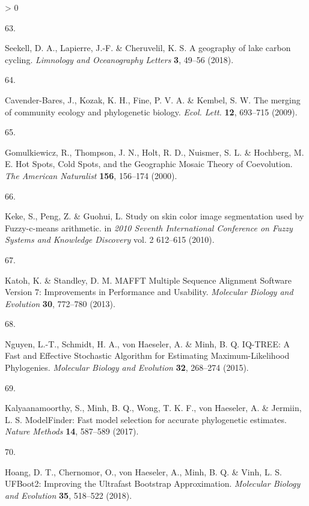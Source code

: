 \documentclass[10pt,oneside]{article}
\newlength{\cslhangindent}
\newlength{\csllabelwidth}
\newenvironment{CSLReferences}[3] %
 {%
  \setlength{\parindent}{0pt}
  \ifodd #1 \everypar{\setlength{\hangindent}{\cslhangindent}}\ignorespaces\fi
  \ifnum #2 > 0
  \setlength{\parskip}{#2\baselineskip}
  \fi
 }%
 {}
\newcommand{\CSLLeftMargin}[1]{\parbox[t]{\maxof{\widthof{#1}}{\csllabelwidth}}{#1}}
\newcommand{\CSLRightInline}[1]{\parbox[t]{\linewidth}{#1}}
\begin{document}
\begin{CSLReferences}{0}{0}
\leavevmode\hypertarget{ref-Seekell2018GeoLak}{}%
\CSLLeftMargin{63. }
\CSLRightInline{Seekell, D. A., Lapierre, J.-F. \& Cheruvelil, K. S. A
geography of lake carbon cycling. \emph{Limnology and Oceanography
Letters} \textbf{3}, 49--56 (2018).}

\leavevmode\hypertarget{ref-Cavender-Bares2009MerCom}{}%
\CSLLeftMargin{64. }
\CSLRightInline{Cavender-Bares, J., Kozak, K. H., Fine, P. V. A. \&
Kembel, S. W. The merging of community ecology and phylogenetic biology.
\emph{Ecol. Lett.} \textbf{12}, 693--715 (2009).}

\leavevmode\hypertarget{ref-Gomulkiewicz2000HotSpo}{}%
\CSLLeftMargin{65. }
\CSLRightInline{Gomulkiewicz, R., Thompson, J. N., Holt, R. D., Nuismer,
S. L. \& Hochberg, M. E. Hot Spots, Cold Spots, and the Geographic
Mosaic Theory of Coevolution. \emph{The American Naturalist}
\textbf{156}, 156--174 (2000).}

\leavevmode\hypertarget{ref-Keke2010StuSki}{}%
\CSLLeftMargin{66. }
\CSLRightInline{Keke, S., Peng, Z. \& Guohui, L. Study on skin color
image segmentation used by Fuzzy-c-means arithmetic. in \emph{2010
Seventh International Conference on Fuzzy Systems and Knowledge
Discovery} vol. 2 612--615 (2010).}

\leavevmode\hypertarget{ref-Katoh2013MafMul}{}%
\CSLLeftMargin{67. }
\CSLRightInline{Katoh, K. \& Standley, D. M. MAFFT Multiple Sequence
Alignment Software Version 7: Improvements in Performance and Usability.
\emph{Molecular Biology and Evolution} \textbf{30}, 772--780 (2013).}

\leavevmode\hypertarget{ref-Nguyen2015IqtFas}{}%
\CSLLeftMargin{68. }
\CSLRightInline{Nguyen, L.-T., Schmidt, H. A., von Haeseler, A. \& Minh,
B. Q. IQ-TREE: A Fast and Effective Stochastic Algorithm for Estimating
Maximum-Likelihood Phylogenies. \emph{Molecular Biology and Evolution}
\textbf{32}, 268--274 (2015).}

\leavevmode\hypertarget{ref-Kalyaanamoorthy2017ModFas}{}%
\CSLLeftMargin{69. }
\CSLRightInline{Kalyaanamoorthy, S., Minh, B. Q., Wong, T. K. F., von
Haeseler, A. \& Jermiin, L. S. ModelFinder: Fast model selection for
accurate phylogenetic estimates. \emph{Nature Methods} \textbf{14},
587--589 (2017).}

\leavevmode\hypertarget{ref-Hoang2018UfbImp}{}%
\CSLLeftMargin{70. }
\CSLRightInline{Hoang, D. T., Chernomor, O., von Haeseler, A., Minh, B.
Q. \& Vinh, L. S. UFBoot2: Improving the Ultrafast Bootstrap
Approximation. \emph{Molecular Biology and Evolution} \textbf{35},
518--522 (2018).}


\end{CSLReferences}
\end{document}
